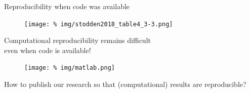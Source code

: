 \begin{frame}{Reproducibility when code was available}

    \begin{figure}
      \centering
      \texttt{[image: \%
      img/stodden2018\_table4\_3-3.png]} %
    \end{figure}

    \vspace{-1.5cm}
  
\begin{center}
  {\large Computational reproducibility remains difficult \\even
    when code is available!}
      
\end{center}
  
    
\end{frame}


\begin{frame}{}
  
  \begin{figure}
    \centering
    \texttt{[image: \%
    img/matlab.png]} %
  \end{figure}

  \begin{center}
  \large How to publish our research so that (computational) results are reproducible?    
  \end{center}

  
\end{frame}

